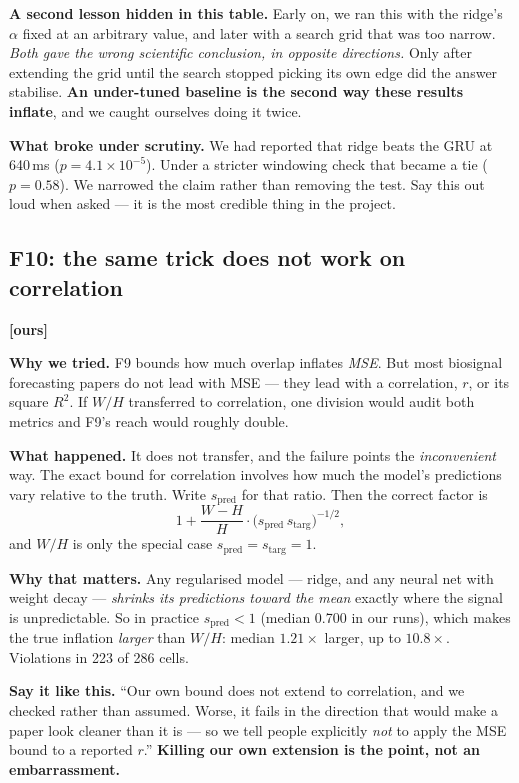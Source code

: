 \documentclass[11pt]{article}
\begin{document}
\textbf{A second lesson hidden in this table.} Early on, we ran this with the
ridge's $\alpha$ fixed at an arbitrary value, and later with a search grid that
was too narrow. \emph{Both gave the wrong scientific conclusion, in opposite
directions.} Only after extending the grid until the search stopped picking its
own edge did the answer stabilise. \textbf{An under-tuned baseline is the second
way these results inflate}, and we caught ourselves doing it twice.

\textbf{What broke under scrutiny.} We had reported that ridge beats the GRU at
640\,ms ($p=4.1\times10^{-5}$). Under a stricter windowing check that became a tie
($p = 0.58$). We narrowed the claim rather than removing the test. Say this out
loud when asked --- it is the most credible thing in the project.

\subsection{F10: the same trick does not work on correlation} \textbf{[ours]}

\textbf{Why we tried.} F9 bounds how much overlap inflates \emph{MSE}. But most
biosignal forecasting papers do not lead with MSE --- they lead with a
correlation, $r$, or its square $R^2$. If $W/H$ transferred to correlation, one
division would audit both metrics and F9's reach would roughly double.

\textbf{What happened.} It does not transfer, and the failure points the
\emph{inconvenient} way. The exact bound for correlation involves how much the
model's predictions vary relative to the truth. Write $s_{\text{pred}}$ for that
ratio. Then the correct factor is
\begin{equation}
1 + \frac{W-H}{H}\cdot\bigl(s_{\text{pred}}\, s_{\text{targ}}\bigr)^{-1/2},
\end{equation}
and $W/H$ is only the special case $s_{\text{pred}} = s_{\text{targ}} = 1$.

\textbf{Why that matters.} Any regularised model --- ridge, and any neural net
with weight decay --- \emph{shrinks its predictions toward the mean} exactly where
the signal is unpredictable. So in practice $s_{\text{pred}} < 1$ (median 0.700 in
our runs), which makes the true inflation \emph{larger} than $W/H$: median
$1.21\times$ larger, up to $10.8\times$. Violations in 223 of 286 cells.

\begin{keybox}
\textbf{Say it like this.} ``Our own bound does not extend to correlation, and we
checked rather than assumed. Worse, it fails in the direction that would make a
paper look cleaner than it is --- so we tell people explicitly \emph{not} to apply
the MSE bound to a reported $r$.'' \textbf{Killing our own extension is the point,
not an embarrassment.}
\end{keybox}
\end{document}
